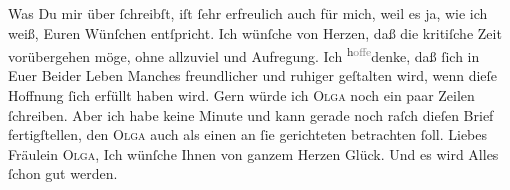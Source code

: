 \pstart
           Was Du mir über \label{K_L03097-2v}\label{K_L03097-2} ſchreibſt, iſt ſehr erfreulich auch für mich, weil es ja, wie ich
               weiß, Euren Wünſchen entſpricht. Ich wünſche von Herzen, daß die kritiſche Zeit
               vorübergehen möge, ohne  allzuviel \label{K_L03097-3v}\label{K_L03097-3} und Aufregung. Ich \substVorne{}\textsuperscript{h\textcolor{gray}{offe}}\substDazwischen{}denke\substHinten{}, daß ſich in Euer Beider Leben Manches freundlicher {\pb}und ruhiger geſtalten wird, wenn dieſe Hoffnung ſich
               erfüllt haben wird. Gern würde ich \textsc{Olga} noch ein paar
               Zeilen ſchreiben. Aber ich habe keine Minute und kann gerade noch raſch dieſen Brief
               fertigſtellen, den \textsc{Olga} auch als einen an ſie gerichteten
               betrachten ſoll. Liebes Fräulein \textsc{Olga}, Ich wünſche Ihnen
               von ganzem Herzen Glück. Und es wird Alles ſchon gut werden.\pend
           
